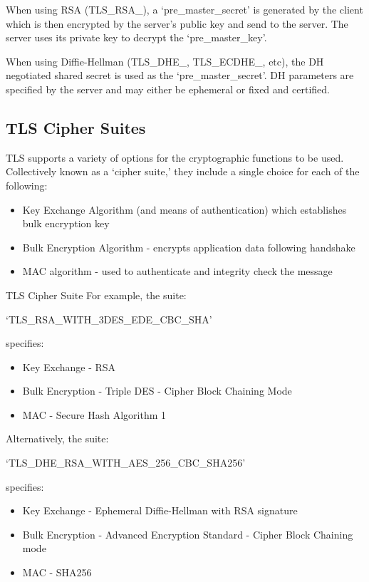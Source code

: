 When using RSA (TLS\_RSA\_), a `pre\_master\_secret' is generated by the client which is then encrypted by the server's public key and send to the server. The server uses its private key to decrypt the `pre\_master\_key'. 

When using Diffie-Hellman (TLS\_DHE\_, TLS\_ECDHE\_, etc), the DH negotiated shared secret is used as the `pre\_master\_secret'. DH parameters are specified by the server and may either be ephemeral or fixed and certified.

\subsection{TLS Cipher Suites}
TLS supports a variety of options for the cryptographic functions to be used. Collectively known as a `cipher suite,' they include a single choice for each of the following:
\begin{itemize}
    \item Key Exchange Algorithm (and means of authentication) which establishes bulk encryption key
    \item Bulk Encryption Algorithm - encrypts application data following handshake
    \item MAC algorithm - used to authenticate and integrity check the message
\end{itemize}

\begin{example}{TLS Cipher Suite}
For example, the suite:
\begin{center}
`TLS\_RSA\_WITH\_3DES\_EDE\_CBC\_SHA'
\end{center}
specifies:
\begin{itemize}
    \item Key Exchange - RSA
    \item Bulk Encryption - Triple DES - Cipher Block Chaining Mode
    \item MAC - Secure Hash Algorithm 1
\end{itemize}

Alternatively, the suite:
\begin{center}
`TLS\_DHE\_RSA\_WITH\_AES\_256\_CBC\_SHA256'
\end{center}
specifies:
\begin{itemize}
    \item Key Exchange - Ephemeral Diffie-Hellman with RSA signature
    \item Bulk Encryption - Advanced Encryption Standard - Cipher Block Chaining mode
    \item MAC - SHA256
\end{itemize}
\end{example}

